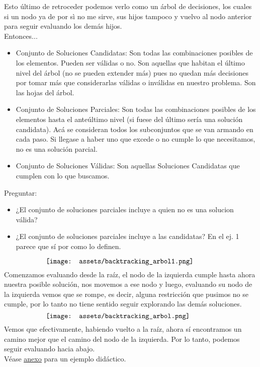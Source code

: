 \documentclass[10pt,a4paper]{article}
\begin{document}
Esto último de retroceder podemos verlo como un árbol de decisiones, los cuales si un nodo ya de por sì no me sirve, sus hijos tampoco y vuelvo al nodo anterior para seguir evaluando los demás hijos. \\
Entonces...
\begin{itemize}
    \item Conjunto de Soluciones Candidatas: Son todas las combinaciones posibles de los elementos. Pueden ser válidas o no. Son aquellas que habitan el último nivel del árbol (no se pueden extender más) pues no quedan más decisiones por tomar más que considerarlas válidas o inválidas en nuestro problema. Son las hojas del árbol.
    \item Conjunto de Soluciones Parciales: Son todas las combinaciones posibles de los elementos hasta el anteúltimo nivel (si fuese del último sería una solución candidata). Acá se consideran todos los subconjuntos que se van armando en cada paso. Si llegase a haber uno que excede o no cumple lo que necesitamos, no es una solución parcial.
    \item Conjunto de Soluciones Válidas: Son aquellas Soluciones Candidatas que cumplen con lo que buscamos.
\end{itemize}
Preguntar: 
\begin{itemize}
    \item ¿El conjunto de soluciones parciales incluye a quien no es una solucion válida? 
    \item ¿El conjunto de soluciones parciales incluye a las candidatas? En el ej. 1 parece que sí por como lo definen.
\end{itemize}

\[\begin{minipage}[b]{0.7\textwidth}
    \texttt{[image: assets/backtracking\_arbol1.png]}
\end{minipage}\]
Comenzamos evaluando desde la raíz, el nodo de la izquierda cumple hasta ahora nuestra posible solución, nos movemos a ese nodo y luego, evaluando su nodo de la izquierda vemos que se rompe, es decir, alguna restricción que pusimos no se cumple, por lo tanto no tiene sentido seguir explorando las demás soluciones. 
\[\begin{minipage}[b]{0.7\textwidth}
    \texttt{[image: assets/backtracking\_arbol.png]}
\end{minipage}\]
Vemos que efectivamente, habiendo vuelto a la raíz, ahora sí encontramos un camino mejor que el camino del nodo de la izquierda. Por lo tanto, podemos seguir evaluando hacia abajo. \\
Véase \hyperref[subsec:backtracking_ex]{\underline{anexo}} para un ejemplo didáctico.
\end{document}
